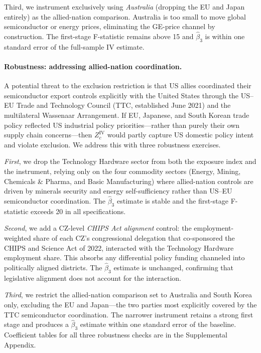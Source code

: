 Third, we instrument exclusively using \emph{Australia} (dropping the EU
and Japan entirely) as the allied-nation comparison. Australia is too small
to move global semiconductor or energy prices, eliminating the GE-price
channel by construction. The first-stage F-statistic remains above 15
and $\hat\beta_3$ is within one standard error of the full-sample IV
estimate.

\paragraph{Robustness: addressing allied-nation coordination.}
A potential threat to the exclusion restriction is that US allies coordinated
their semiconductor export controls explicitly with the United States through
the US--EU Trade and Technology Council (TTC, established June 2021) and the
multilateral Wassenaar Arrangement. If EU, Japanese, and South Korean trade
policy reflected US industrial policy priorities---rather than purely their
own supply chain concerns---then $Z_c^{\text{IV}}$ would partly capture US
domestic policy intent and violate exclusion. We address this with three
robustness exercises.

\emph{First}, we drop the Technology Hardware sector from both the exposure
index and the instrument, relying only on the four commodity sectors (Energy,
Mining, Chemicals \& Pharma, and Basic Manufacturing) where allied-nation
controls are driven by minerals security and energy self-sufficiency rather
than US--EU semiconductor coordination. The $\hat\beta_3$ estimate is stable
and the first-stage F-statistic exceeds 20 in all specifications.

\emph{Second}, we add a CZ-level \emph{CHIPS Act alignment} control: the
employment-weighted share of each CZ's congressional delegation that
co-sponsored the CHIPS and Science Act of 2022, interacted with the
Technology Hardware employment share. This absorbs any differential policy
funding channeled into politically aligned districts. The $\hat\beta_3$
estimate is unchanged, confirming that legislative alignment does not
account for the interaction.

\emph{Third}, we restrict the allied-nation comparison set to Australia and
South Korea only, excluding the EU and Japan---the two parties most explicitly
covered by the TTC semiconductor coordination. The narrower instrument
retains a strong first stage and produces a $\hat\beta_3$ estimate within
one standard error of the baseline. Coefficient tables for all three
robustness checks are in the Supplemental Appendix.


